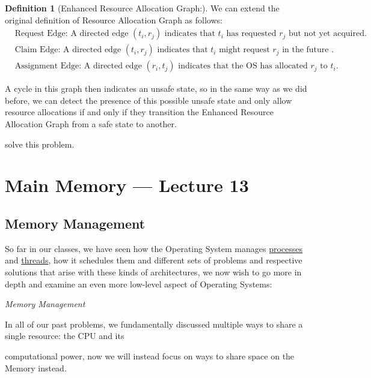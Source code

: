 \documentclass[openright, twoside]{report}
\theoremstyle{definition}
\newtheorem{definition}{Definition}[section]
\theoremstyle{example}
\begin{document}
	\begin{definition}[Enhanced Resource Allocation Graph:]
		We can extend the original definition of Resource Allocation Graph as follows:
		\begin{align*}
			&\text{Request Edge: A directed edge } (t_i, r_j) \text{ indicates that } t_i \text{ has requested } r_j \text{ but not yet acquired}.\\
			&\text{Claim Edge: A directed edge } (t_i, r_j) \text{ indicates that } t_i \text{ might request } r_j \text{ in the future }.\\
			&\text{Assignment Edge: A directed edge } (r_i, t_j) \text{ indicates that the OS has allocated } r_j \text{ to } t_i.
		\end{align*}

		A cycle in this graph then indicates an unsafe state, so in the same way as we did before, we can detect the 
		presence of this possible unsafe state and only allow resource allocations if and only if they transition 
		the Enhanced Resource Allocation Graph from a safe state to another.
		
	\end{definition}

			solve this problem.
		
\chapter{Main Memory --- Lecture 13}
	\section{Memory Management}
			So far in our classes, we have seen how the Operating System manages \hyperref[ssec:proc]{processes} and \hyperref[sec:threads]{threads}, how it schedules them 
			and different sets of problems and respective solutions that arise with these kinds of architectures, we now 
			wish to go more in depth and examine an even more low-level aspect of Operating Systems:

			\begin{center}
				\emph{Memory Management}
			\end{center}

			In all of our past problems, we fundamentally discussed multiple ways to share a single resource: the CPU and its 
	
			computational power, now we will instead focus on ways to share space on the Memory instead.
\end{document}
